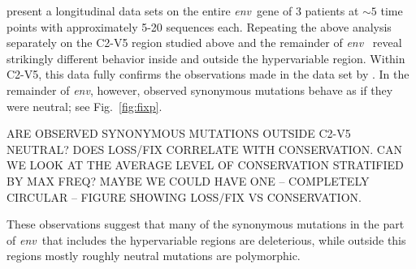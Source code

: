 \documentclass[rmp, twocolumn]{revtex4}
\newcommand{\env}{\textit{env}}
\newcommand{\FIG}[1]{Fig.~\ref{fig:#1}}
\begin{document}
\citet{bunnik_autologous_2008} present a longitudinal data sets on the entire
\env~gene of 3 patients at $\sim 5$ time points with approximately 5-20
sequences each. Repeating the above analysis separately on the C2-V5 region
studied above and the remainder of \env~ reveal strikingly different behavior
inside and outside the hypervariable region. Within C2-V5, this data fully
confirms the observations made in the data set by
\citet{shankarappa_consistent_1999}. In the remainder of \env, however, observed
synonymous mutations behave as if they were neutral; see \FIG{fixp}. 

ARE OBSERVED SYNONYMOUS MUTATIONS OUTSIDE C2-V5 NEUTRAL? DOES LOSS/FIX CORRELATE WITH CONSERVATION. CAN WE LOOK AT THE AVERAGE LEVEL OF CONSERVATION STRATIFIED BY MAX FREQ? MAYBE WE COULD HAVE ONE -- COMPLETELY CIRCULAR -- FIGURE SHOWING LOSS/FIX VS CONSERVATION.

These observations suggest that many of the synonymous mutations in the part of
\env~that includes the hypervariable regions are deleterious, while outside
this regions mostly roughly neutral mutations are polymorphic.
\end{document}
